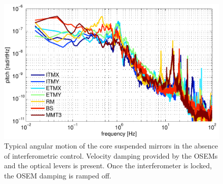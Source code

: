 \begin{figure}
\begin{centering}
\includegraphics[width=1.0\columnwidth]{figures/seismic_mirrormotion.pdf}
\caption[Typical angular motion of the core suspended mirrors in the
  absence of interferometric control]{Typical angular motion of the core suspended mirrors in the
  absence of interferometric control. Velocity damping provided by the
 OSEMs and the optical levers is present. Once the interferometer is locked, the OSEM damping is ramped off. 
}
\label{fig:seismicMirror}
\end{centering}
\end{figure}






